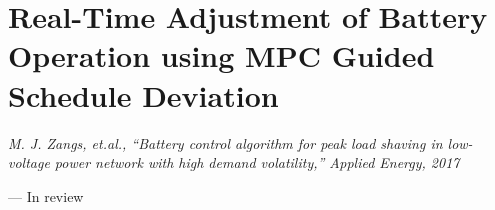 \chapter{Real-Time Adjustment of Battery Operation using MPC Guided Schedule Deviation}
\label{ch2}

\singlespacing
\epigraph{\textit{M. J. Zangs, et.al., ``Battery control algorithm for peak load shaving in low-voltage power network with high demand volatility,'' Applied Energy, 2017}}{--- In review}
\doublespacing















